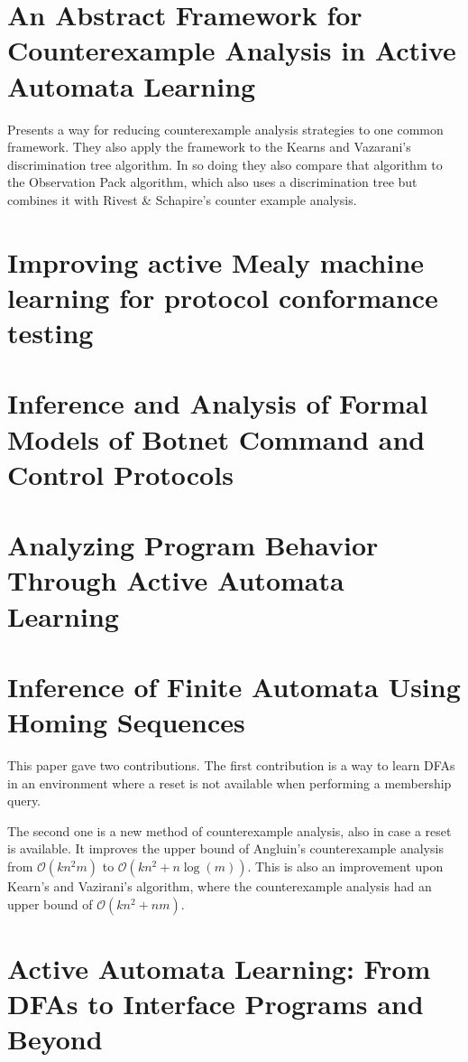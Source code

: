 \documentclass[11pt]{article}
\begin{document}
\section{An Abstract Framework for Counterexample Analysis in Active Automata Learning\cite{Isberner14a}}
Presents a way for reducing counterexample analysis strategies to one common
framework. They also apply the framework to the Kearns and Vazarani's
discrimination tree algorithm\cite{Kearns94}. In so doing they also compare that
algorithm to the Observation Pack algorithm, which also uses a discrimination
tree but combines it with Rivest \& Schapire's counter example
analysis\cite{Rivest93}.

\section{\cite{Aarts13} Improving active Mealy machine learning for protocol conformance testing}
\section{\cite{Cho10} Inference and Analysis of Formal Models of Botnet Command and Control Protocols}
\section{\cite{Bauer14} Analyzing Program Behavior Through Active Automata Learning}
\section{Inference of Finite Automata Using Homing Sequences\cite{Rivest93}}
This paper gave two contributions. The first contribution is a way to learn DFAs
in an environment where a reset is not available when performing a membership
query.

The second one is a new method of counterexample analysis, also in case a reset
is available. It improves the upper bound of Angluin's counterexample analysis
from $\mathcal{O}(kn^2m)$ to
$\mathcal{O}(kn^2 + n \log(m))$\cite{Angluin87,Rivest93}. This is also an
improvement upon Kearn's and Vazirani's algorithm, where the counterexample
analysis had an upper bound of
$\mathcal{O}(kn^2 + nm)$\cite{Kearns94,Isberner15}.
\section{\cite{Steffen12} Active Automata Learning: From DFAs to Interface Programs and Beyond}
\end{document}
